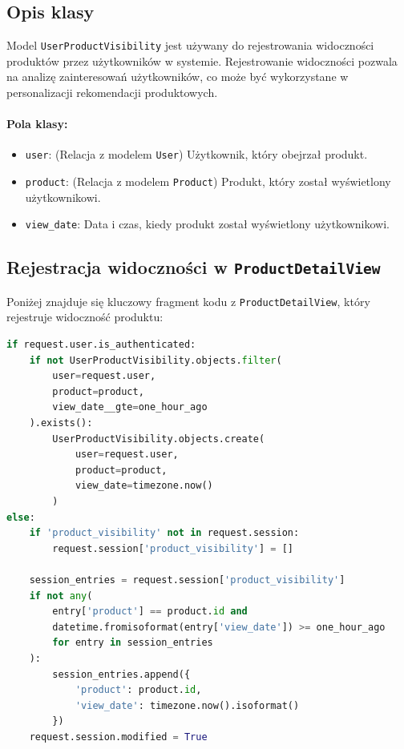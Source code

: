 \documentclass[12pt,a4paper,oneside]{article}
\theoremstyle{definition}
\numberwithin{equation}{section}
\begin{document}
\subsection{Opis klasy}
Model \texttt{UserProductVisibility} jest używany do rejestrowania widoczności produktów przez użytkowników w systemie. Rejestrowanie widoczności pozwala na analizę zainteresowań użytkowników, co może być wykorzystane w personalizacji rekomendacji produktowych.

\paragraph{Pola klasy:}
\begin{itemize}
    \item \texttt{user}: (Relacja z modelem \texttt{User}) Użytkownik, który obejrzał produkt.
    \item \texttt{product}: (Relacja z modelem \texttt{Product}) Produkt, który został wyświetlony użytkownikowi.
    \item \texttt{view\_date}: Data i czas, kiedy produkt został wyświetlony użytkownikowi.
\end{itemize}

\subsection{Rejestracja widoczności w \texttt{ProductDetailView}}
Poniżej znajduje się kluczowy fragment kodu z \texttt{ProductDetailView}, który rejestruje widoczność produktu:

\begin{lstlisting}[language=Python]
if request.user.is_authenticated:
    if not UserProductVisibility.objects.filter(
        user=request.user, 
        product=product, 
        view_date__gte=one_hour_ago
    ).exists():
        UserProductVisibility.objects.create(
            user=request.user, 
            product=product, 
            view_date=timezone.now()
        )
else:
    if 'product_visibility' not in request.session:
        request.session['product_visibility'] = []

    session_entries = request.session['product_visibility']
    if not any(
        entry['product'] == product.id and 
        datetime.fromisoformat(entry['view_date']) >= one_hour_ago
        for entry in session_entries
    ):
        session_entries.append({
            'product': product.id,
            'view_date': timezone.now().isoformat()
        })
    request.session.modified = True
\end{lstlisting}
\end{document}
